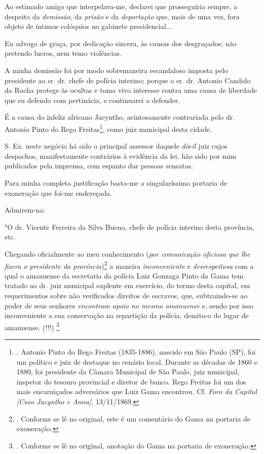 Ao estimado amigo que interpelava-me, declarei que prosseguiria sempre,
a despeito da \emph{demissão}, da \emph{prisão} e da \emph{deportação}
que, mais de uma vez, fora objeto de íntimos colóquios no gabinete
presidencial...

Eu advogo de graça, por dedicação sincera, às causas dos desgraçados;
não pretendo lucros, nem temo violências.

A minha demissão foi por modo sobremaneira escandaloso imposta pelo
presidente ao sr. dr. chefe de polícia interino; porque o sr. dr.
Antonio Candido da Rocha protege às ocultas e toma vivo interesse contra
uma causa de liberdade que eu defendo com pertinácia, e continuarei a
defender.

É a causa do infeliz africano Jacyntho, acintosamente contrariada pelo
dr. Antonio Pinto do Rego Freitas\footnote{. Antonio Pinto do Rego
  Freitas (1835-1886), nascido em São Paulo (SP), foi um político e juiz
  de destaque no cenário local. Durante as décadas de 1860 e 1880, foi
  presidente da Câmara Municipal de São Paulo, juiz municipal, inspetor
  do tesouro provincial e diretor de banco. Rego Freitas foi um dos mais
  encarniçados adversários que Luiz Gama encontrou. Cf. \emph{Foro da
  Capital {[}Caso Jacyntho e Anna{]}}, 13/11/1869.}, como juiz municipal
desta cidade.

S. Ex. neste negócio há sido o principal assessor daquele \emph{dócil}
juiz cujos despachos, manifestamente contrários à evidência da lei, hão
sido por mim publicados pela imprensa, com espanto das pessoas sensatas.

Para minha completa justificação basta-me a singularíssima portaria de
exoneração que foi-me endereçada.

Admirem-na:

"O dr. Vicente Ferreira da Silva Bueno, chefe de polícia interino desta
província, etc.

Chegando oficialmente ao meu conhecimento (\emph{por comunicação
oficiosa que lhe fizera o presidente da província})\footnote{. Conforme
  se lê no original, este é um comentário do Gama na portaria de
  exoneração.} a maneira \emph{inconveniente} e \emph{desrespeitosa} com
a qual o amanuense da secretaria da polícia Luiz Gonzaga Pinto da Gama
tem tratado ao dr. juiz municipal suplente em exercício, do termo desta
capital, em requerimentos sobre não verificados direitos de escravos,
que, subtraindo-se ao poder de seus senhores \emph{encontram apoio no
mesmo amanuense} e, sendo por isso inconveniente a sua conservação na
repartição da polícia, demito-o do lugar de amanuense. (!!!) \footnote{.
  Conforme se lê no original, anotação do Gama na portaria de
  exoneração.}

